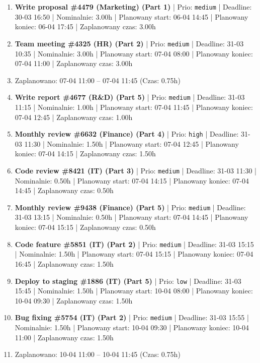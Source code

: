 {\begin{enumerate}
  \item [\textbf{14660}] \textbf{Write proposal \#4479 (Marketing) (Part 1)} | Prio: \texttt{medium} | Deadline: 30-03 16:50 | Nominalnie: 3.00h | Planowany start: 06-04 14:45 | Planowany koniec: 06-04 17:45 | Zaplanowany czas: 3.00h
  \item [\textbf{14641}] \textbf{Team meeting \#4325 (HR) (Part 2)} | Prio: \texttt{medium} | Deadline: 31-03 10:35 | Nominalnie: 3.00h | Planowany start: 07-04 08:00 | Planowany koniec: 07-04 11:00 | Zaplanowany czas: 3.00h
  \item [\textbf{PRZERWA}] Zaplanowano: 07-04 11:00 -- 07-04 11:45 (Czas: 0.75h)
  \item [\textbf{14640}] \textbf{Write report \#4677 (R\&D) (Part 5)} | Prio: \texttt{medium} | Deadline: 31-03 11:15 | Nominalnie: 1.00h | Planowany start: 07-04 11:45 | Planowany koniec: 07-04 12:45 | Zaplanowany czas: 1.00h
  \item [\textbf{14615}] \textbf{Monthly review \#6632 (Finance) (Part 4)} | Prio: \texttt{high} | Deadline: 31-03 11:30 | Nominalnie: 1.50h | Planowany start: 07-04 12:45 | Planowany koniec: 07-04 14:15 | Zaplanowany czas: 1.50h
  \item [\textbf{14665}] \textbf{Code review \#8421 (IT) (Part 3)} | Prio: \texttt{medium} | Deadline: 31-03 11:30 | Nominalnie: 0.50h | Planowany start: 07-04 14:15 | Planowany koniec: 07-04 14:45 | Zaplanowany czas: 0.50h
  \item [\textbf{14656}] \textbf{Monthly review \#9438 (Finance) (Part 5)} | Prio: \texttt{medium} | Deadline: 31-03 13:15 | Nominalnie: 0.50h | Planowany start: 07-04 14:45 | Planowany koniec: 07-04 15:15 | Zaplanowany czas: 0.50h
  \item [\textbf{14643}] \textbf{Code feature \#5851 (IT) (Part 2)} | Prio: \texttt{medium} | Deadline: 31-03 15:15 | Nominalnie: 1.50h | Planowany start: 07-04 15:15 | Planowany koniec: 07-04 16:45 | Zaplanowany czas: 1.50h
  \item [\textbf{14697}] \textbf{Deploy to staging \#1886 (IT) (Part 5)} | Prio: \texttt{low} | Deadline: 31-03 15:45 | Nominalnie: 1.50h | Planowany start: 10-04 08:00 | Planowany koniec: 10-04 09:30 | Zaplanowany czas: 1.50h
  \item [\textbf{14631}] \textbf{Bug fixing \#5754 (IT) (Part 2)} | Prio: \texttt{medium} | Deadline: 31-03 15:55 | Nominalnie: 1.50h | Planowany start: 10-04 09:30 | Planowany koniec: 10-04 11:00 | Zaplanowany czas: 1.50h
  \item [\textbf{PRZERWA}] Zaplanowano: 10-04 11:00 -- 10-04 11:45 (Czas: 0.75h)

\end{enumerate}}

